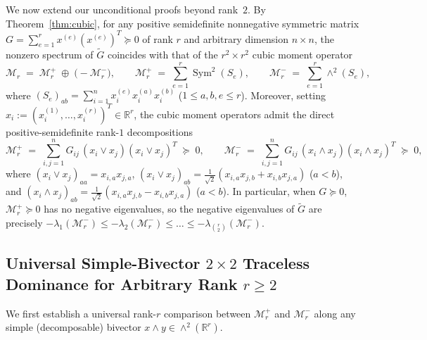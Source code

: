 \documentclass[11pt,a4paper]{article}
\theoremstyle{plain}
\theoremstyle{definition}
\theoremstyle{remark}
\DeclareMathOperator{\Sym}{Sym}
\begin{document}
We now extend our unconditional proofs beyond rank~$2$. By Theorem~\ref{thm:cubic}, for any positive semidefinite nonnegative symmetric matrix $G = \sum_{e=1}^r x^{(e)}(x^{(e)})^T \succeq 0$ of rank $r$ and arbitrary dimension $n \times n$, the nonzero spectrum of $\widetilde{G}$ coincides with that of the $r^2 \times r^2$ cubic moment operator
\[
  \mathcal{M}_r \;=\; \mathcal{M}_r^+ \;\oplus\; \big(-\mathcal{M}_r^-\big), \qquad
  \mathcal{M}_r^+ \;=\; \sum_{e=1}^r \Sym^2(S_e), \qquad
  \mathcal{M}_r^- \;=\; \sum_{e=1}^r \wedge^2(S_e),
\]
where $(S_e)_{ab} = \sum_{i=1}^n x_i^{(e)} x_i^{(a)} x_i^{(b)}$ ($1 \le a,b,e \le r$). Moreover, setting $x_i := (x_i^{(1)},\dots,x_i^{(r)})^T \in \mathbb{R}^r$, the cubic moment operators admit the direct positive-semidefinite rank-$1$ decompositions
\begin{equation}\label{eq:vee_wedge_sum}
  \mathcal{M}_r^+ \;=\; \sum_{i,j=1}^n G_{ij}\, (x_i \vee x_j)(x_i \vee x_j)^T \;\succeq\; 0, \qquad
  \mathcal{M}_r^- \;=\; \sum_{i,j=1}^n G_{ij}\, (x_i \wedge x_j)(x_i \wedge x_j)^T \;\succeq\; 0,
\end{equation}
where $(x_i \vee x_j)_{aa} = x_{i,a}x_{j,a}$, $(x_i \vee x_j)_{ab} = \frac{1}{\sqrt{2}}(x_{i,a}x_{j,b} + x_{i,b}x_{j,a})$ ($a < b$), and $(x_i \wedge x_j)_{ab} = \frac{1}{\sqrt{2}}(x_{i,a}x_{j,b} - x_{i,b}x_{j,a})$ ($a < b$). In particular, when $G \succeq 0$, $\mathcal{M}_r^+ \succeq 0$ has no negative eigenvalues, so the negative eigenvalues of $\widetilde{G}$ are precisely $-\lambda_1(\mathcal{M}_r^-) \le -\lambda_2(\mathcal{M}_r^-) \le \dots \le -\lambda_{\binom{r}{2}}(\mathcal{M}_r^-)$.

\subsection{Universal Simple-Bivector \texorpdfstring{$2 \times 2$}{2x2} Traceless Dominance for Arbitrary Rank \texorpdfstring{$r \ge 2$}{r >= 2}}

We first establish a universal rank-$r$ comparison between $\mathcal{M}_r^+$ and $\mathcal{M}_r^-$ along any simple (decomposable) bivector $x \wedge y \in \wedge^2(\mathbb{R}^r)$.
\end{document}
